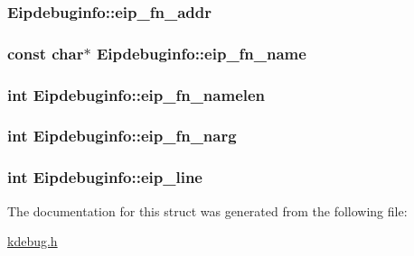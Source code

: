 \subsubsection[{\texorpdfstring{eip\+\_\+fn\+\_\+addr}{eip_fn_addr}}]{ Eipdebuginfo\+::eip\+\_\+fn\+\_\+addr}\hypertarget{structEipdebuginfo_a862fd972f792c828e2f2519e57c7f011}{}\label{structEipdebuginfo_a862fd972f792c828e2f2519e57c7f011}
\subsubsection[{\texorpdfstring{eip\+\_\+fn\+\_\+name}{eip_fn_name}}]{\setlength{\rightskip}{0pt plus 5cm}const char$\ast$ Eipdebuginfo\+::eip\+\_\+fn\+\_\+name}\hypertarget{structEipdebuginfo_a5e8cc118e7d6fd43dfaf6126cb2a4fe0}{}\label{structEipdebuginfo_a5e8cc118e7d6fd43dfaf6126cb2a4fe0}
\subsubsection[{\texorpdfstring{eip\+\_\+fn\+\_\+namelen}{eip_fn_namelen}}]{\setlength{\rightskip}{0pt plus 5cm}int Eipdebuginfo\+::eip\+\_\+fn\+\_\+namelen}\hypertarget{structEipdebuginfo_afacac024e9d624f641169c9bb095b2b6}{}\label{structEipdebuginfo_afacac024e9d624f641169c9bb095b2b6}
\subsubsection[{\texorpdfstring{eip\+\_\+fn\+\_\+narg}{eip_fn_narg}}]{\setlength{\rightskip}{0pt plus 5cm}int Eipdebuginfo\+::eip\+\_\+fn\+\_\+narg}\hypertarget{structEipdebuginfo_a78772b4f4ca1428fe983cd7778324504}{}\label{structEipdebuginfo_a78772b4f4ca1428fe983cd7778324504}
\subsubsection[{\texorpdfstring{eip\+\_\+line}{eip_line}}]{\setlength{\rightskip}{0pt plus 5cm}int Eipdebuginfo\+::eip\+\_\+line}\hypertarget{structEipdebuginfo_a50c332e0b0310474b13924a4f6e9fdf4}{}\label{structEipdebuginfo_a50c332e0b0310474b13924a4f6e9fdf4}


The documentation for this struct was generated from the following file\+:\begin{DoxyCompactItemize}
\item 
\hyperlink{kdebug_8h}{kdebug.\+h}\end{DoxyCompactItemize}
